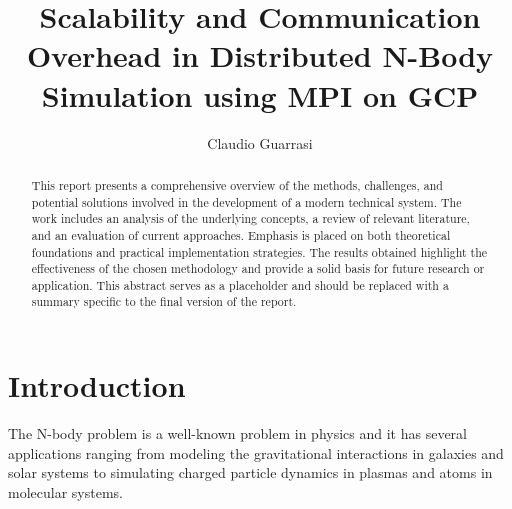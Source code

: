 \documentclass{article}
\title{\textbf{Scalability and Communication Overhead in Distributed N-Body Simulation using MPI on GCP}\\}
\author{Claudio Guarrasi\\[1ex]}
\date{%
	\today
	\vspace{-0.25cm}
	\\
	\rule{\textwidth}{0.3pt}}
\begin{document}
\begin{titlingpage}

\maketitle %
\thispagestyle{empty} %

	\begin{multicols*}{2}

		\begin{abstract}
			\centering
			\noindent
			This report presents a comprehensive overview of the methods, challenges, and potential solutions involved in the development of a modern technical system. The work includes an analysis of the underlying concepts, a review of relevant literature, and an evaluation of current approaches. Emphasis is placed on both theoretical foundations and practical implementation strategies. The results obtained highlight the effectiveness of the chosen methodology and provide a solid basis for future research or application. This abstract serves as a placeholder and should be replaced with a summary specific to the final version of the report.
		\end{abstract}
	\newcolumn
		\centering
		\noindent
		\tableofcontents
	\end{multicols*}
\end{titlingpage}

\thispagestyle{plain}

\twocolumn

\section{Introduction}
\label{sec:intro}
The N-body problem is a well-known problem in physics and it has several applications ranging from modeling the gravitational interactions in galaxies and solar systems to simulating charged particle dynamics in plasmas and atoms in molecular systems.
\end{document}
